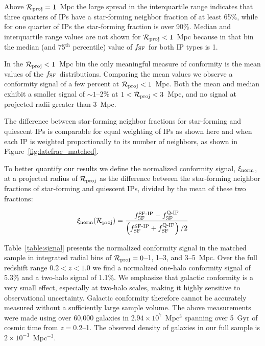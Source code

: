 Above $\mathcal{R}_{\text{proj}}=1$~Mpc the large spread in the interquartile range indicates that three quarters of IPs have a star-forming neighbor fraction of at least 65\%, while for one quarter of IPs the star-forming fraction is over 90\%.
Median and interquartile range values are not shown for ${\mathcal{R}_{\text{proj}}<1}$~Mpc because in that bin the median (and 75$^{\textrm{th}}$ percentile) value of $\flate$ for both IP types is 1.

In the $\mathcal{R}_{\text{proj}}<1$~Mpc bin the only meaningful measure of conformity is the mean values of the $\flate$ distributions.
Comparing the mean values we observe a conformity signal of a few percent at $\mathcal{R}_{\text{proj}}<1$~Mpc.
Both the mean and median exhibit a smaller signal of $\sim1$--2\% at $1<\mathcal{R}_{\text{proj}}<3$~Mpc, and no signal at projected radii greater than 3~Mpc.

The difference between star-forming neighbor fractions for star-forming and quiescent IPs is comparable for equal weighting of IPs as shown here and when each IP is weighted proportionally to its number of neighbors, as shown in Figure~\ref{fig:latefrac_matched}.





To better quantify our results we define the normalized conformity signal, 
$\signorm$, at a projected radius of $\mathcal{R}_{\text{proj}}$ as the difference between the star-forming neighbor fractions of star-forming and quiescent IPs, 
divided by the mean of these two fractions:

\begin{equation}
	\signorm(\Rproj) = \frac
	{ f^{\textrm{SF-IP}}_{\textrm{SF}}-f^{\textrm{Q-IP}}_{\textrm{SF}} }
	{ \left( f^{\textrm{SF-IP}}_{\textrm{SF}}+f^{\textrm{Q-IP}}_{\textrm{SF}} \right) /2}
\label{eq:signorm}
\end{equation}

Table~\ref{table:signal} presents the 
normalized conformity signal in the matched sample in integrated radial bins of 
$\mathcal{R}_{\text{proj}}=0$--1, {1--3}, and {3--5~Mpc}.
Over the full redshift range ${0.2<z<1.0}$ we find a normalized one-halo conformity 
signal of 5.3\% and a two-halo signal of 1.1\%.
We emphasize that galactic conformity is a very small effect, especially at two-halo scales, making it highly sensitive to observational uncertainty.
Galactic conformity therefore cannot be accurately measured without a sufficiently large sample volume.
The above measurements were made using over 60,000 galaxies in ${2.94\times10^7}$~Mpc$^3$ spanning over 5~Gyr of cosmic time from $z=0.2$--1.
The observed density of galaxies in our full sample is ${2\times10^{-3}}$~Mpc$^{-3}$.

